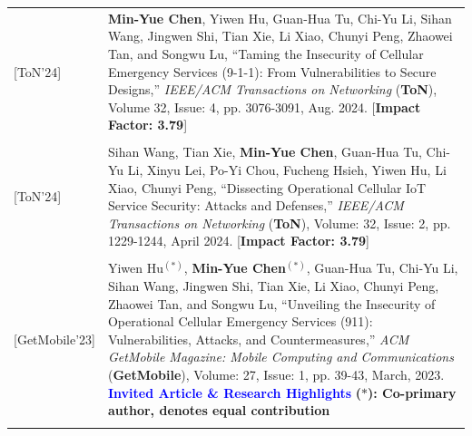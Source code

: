 \begin{longtable}{p{1mm}p{14.5cm}}
\\


\hspace{-14 mm} [ToN'24] 		& 	
\textbf{Min-Yue Chen}, Yiwen Hu, Guan-Hua Tu, Chi-Yu Li, Sihan Wang, Jingwen Shi, Tian Xie, Li Xiao, Chunyi Peng, Zhaowei Tan, and Songwu Lu,
``Taming the Insecurity of Cellular Emergency Services (9-1-1): From Vulnerabilities to Secure Designs,''
\emph{IEEE/ACM Transactions on Networking} (\textbf{ToN}), Volume 32, Issue: 4, pp. 3076-3091, Aug. 2024.
[\textbf{Impact Factor: 3.79}]  \\

\\

\hspace{-14 mm} [ToN'24] 		& 	
Sihan Wang, Tian Xie, \textbf{Min-Yue Chen}, Guan-Hua Tu, Chi-Yu Li, Xinyu Lei, Po-Yi Chou, Fucheng Hsieh, Yiwen Hu, Li Xiao, Chunyi Peng,
``Dissecting Operational Cellular IoT Service Security: Attacks and Defenses,''
\emph{IEEE/ACM Transactions on Networking} (\textbf{ToN}), Volume: 32, Issue: 2, pp. 1229-1244, April 2024.
[\textbf{Impact Factor: 3.79}]  \\

\\




\hspace{-24 mm} [GetMobile'23] 	& Yiwen Hu$^{(\ast)}$, \textbf{Min-Yue Chen$^{(\ast)}$}, Guan-Hua Tu, Chi-Yu Li, Sihan Wang, Jingwen Shi, Tian Xie, Li Xiao, Chunyi Peng, Zhaowei Tan, and Songwu Lu,
``Unveiling the Insecurity of Operational Cellular Emergency Services (911): Vulnerabilities, Attacks, and Countermeasures,''
\emph{ACM GetMobile Magazine: Mobile Computing and Communications} (\textbf{GetMobile}), Volume: 27, Issue: 1, pp. 39-43, March, 2023.
\textcolor{Blue}{\textbf{Invited Article \& Research Highlights}} \newline\textbf{($\ast$): Co-primary author, denotes equal contribution}\\

\\


\end{longtable}

